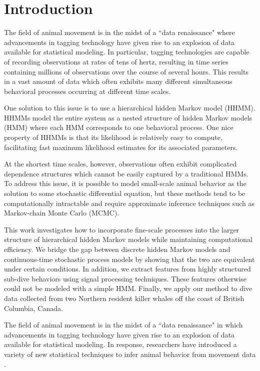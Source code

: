 
\section{Introduction}

The field of animal movement is in the midst of a ``data renaissance" where advancements in tagging technology have given rise to an explosion of data available for statistical modeling. In particular, tagging technologies are capable of recording observations at rates of tens of hertz, resulting in time series containing millions of observations over the course of several hours. This results in a vast amount of data which often exhibits many different simultaneous behavioral processes occurring at different time scales. 

One solution to this issue is to use a hierarchical hidden Markov model (HHMM). HHMMs model the entire system as a nested structure of hidden Markov models (HMM) where each HMM corresponds to one behavioral process. One nice property of HHMMs is that its likelihood is relatively easy to compute, facilitating fast maximum likelihood estimates for its associated parameters.  

At the shortest time scales, however, observations often exhibit complicated dependence structures which cannot be easily captured by a traditional HMMs. To address this issue, it is possible to model small-scale animal behavior as the solution to some stochastic differential equation, but these methods tend to be computationally intractable and require approximate inference techniques such as Markov-chain Monte Carlo (MCMC).

This work investigates how to incorporate fine-scale processes into the larger structure of hierarchical hidden Markov models while maintaining computational efficiency. We bridge the gap between discrete hidden Markov models and continuous-time stochastic process models by showing that the two are equivalent under certain conditions. In addition, we extract features from highly structured sub-dive behaviors using signal processing techniques. These features otherwise could not be modeled with a simple HMM. Finally, we apply our method to dive data collected from two Northern resident killer whales off the coast of British Columbia, Canada.

The field of animal movement is in the midst of a ``data renaissance" in which advancements in tagging technology have given rise to an explosion of data available for statistical modeling. In response, researchers have introduced a variety of new statistical techniques to infer animal behavior from movement data \cite{Hooten:2017}. 

